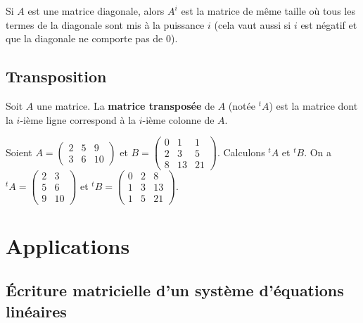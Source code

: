 	\begin{tip}
		Si $A$ est une matrice diagonale, alors $A^i$ est la matrice de même taille où tous les termes de la diagonale sont mis à la puissance $i$ (cela vaut aussi si $i$ est négatif et que la diagonale ne comporte pas de $0$).
	\end{tip}

	\subsection{Transposition}

	\begin{formula}[Définition]
		Soit $A$ une matrice. La \textbf{matrice transposée} de $A$ (notée $^tA$) est la matrice dont la $i$-ième ligne correspond à la $i$-ième colonne de $A$.
	\end{formula}

	\begin{tip}[Exemple]
		Soient $\displaystyle{A = \begin{pmatrix} 2 & 5 & 9 \\ 3 & 6 & 10 \end{pmatrix}}$ et $\displaystyle{B = \begin{pmatrix} 0 & 1 & 1 \\ 2 & 3 & 5 \\ 8 & 13 & 21 \end{pmatrix}}$. Calculons $^tA$ et $^tB$.
		\newpar
		On a $\displaystyle{^tA = \begin{pmatrix} 2 & 3 \\ 5 & 6 \\ 9 & 10 \end{pmatrix}}$ et $\displaystyle{^tB = \begin{pmatrix} 0 & 2 & 8 \\ 1 & 3 & 13 \\ 1 & 5 & 21 \end{pmatrix}}$.
	\end{tip}

	\section{Applications}

	\subsection{Écriture matricielle d'un système d'équations linéaires}

